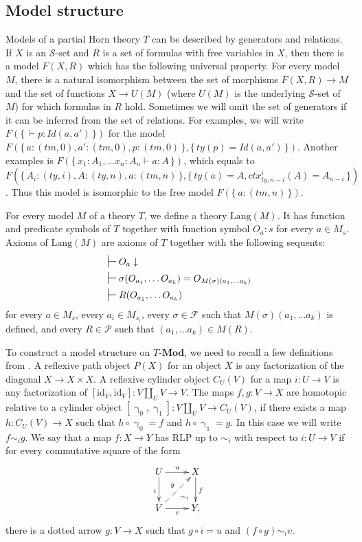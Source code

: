 \documentclass{mscs}
\newcommand{\id}{\mathrm{id}}
\newcommand{\Lang}{\mathrm{Lang}}
\newcommand{\Id}{\mathit{Id}}
\newcommand{\cat}[1]{\mathbf{#1}}
\newcommand{\Mod}[1]{#1\text{-}\cat{Mod}}
\newcommand{\cyli}{\upgamma}
\numberwithin{figure}{section}
\begin{document}
\subsection{Model structure}

Models of a partial Horn theory $T$ can be described by generators and relations.
If $X$ is an $\mathcal{S}$-set and $R$ is a set of formulas with free variables in $X$,
then there is a model $F(X,R)$ which has the following universal property.
For every model $M$, there is a natural isomorphism between the set of morphisms $F(X,R) \to M$
and the set of functions $X \to U(M)$ (where $U(M)$ is the underlying $\mathcal{S}$-set of $M$) for which formulas in $R$ hold.
Sometimes we will omit the set of generators if it can be inferred from the set of relations.
For examples, we will write $F(\{\,\vdash p : \Id(a,a')\,\})$ for the model $F(\{\,a : (tm,0), a' : (tm,0), p : (tm,0)\,\}, \{\,ty(p) = \Id(a,a')\,\})$.
Another examples is $F(\{\,x_1 : A_1, \ldots x_n : A_n \vdash a : A\,\})$,
which equals to $F(\{\,A_i : (ty,i), A : (ty,n), a : (tm,n)\,\}, \{\,ty(a) = A, ctx^i_{ty,n-i}(A) = A_{n-i}\,\})$.
Thus this model is isomorphic to the free model $F(\{\,a : (tm,n)\,\})$.

For every model $M$ of a theory $T$, we define a theory $\Lang(M)$.
It has function and predicate symbols of $T$ together with function symbol $O_a : s$ for every $a \in M_s$.
Axioms of $\Lang(M)$ are axioms of $T$ together with the following sequents:
\begin{align*}
& \sststile{}{} O_a \downarrow \\
& \sststile{}{} \sigma(O_{a_1}, \ldots O_{a_k}) = O_{M(\sigma)(a_1, \ldots a_k)} \\
& \sststile{}{} R(O_{a_1}, \ldots O_{a_k})
\end{align*}
for every $a \in M_s$, every $a_i \in M_{s_i}$,
every $\sigma \in \mathcal{F}$ such that $M(\sigma)(a_1, \ldots a_k)$ is defined,
and every $R \in \mathcal{P}$ such that $(a_1, \ldots a_k) \in M(R)$.

To construct a model structure on $\Mod{T}$, we need to recall a few definitions from \cite{f-model-structures}.
A reflexive path object $P(X)$ for an object $X$ is any factorization of the diagonal $X \to X \times X$.
A reflexive cylinder object $C_U(V)$ for a map $i : U \to V$ is any factorization of $[\id_V,\id_V] : V \amalg_U V \to V$.
The maps $f,g : V \to X$ are homotopic relative to a cylinder object $[\cyli_0,\cyli_1] : V \amalg_U V \to C_U(V)$, if there exists a map $h : C_U(V) \to X$
such that $h \circ \cyli_0 = f$ and $h \circ \cyli_1 = g$.
In this case we will write $f \sim_i g$.
We say that a map $f : X \to Y$ has RLP up to $\sim_i$ with respect to $i : U \to V$ if for every commutative square of the form
\[ \xymatrix{ U \ar[r]^u \ar@{}[dr]|(.7){\sim_i} \ar[d]_i & X \ar[d]^f \\
              V \ar[r]_v \ar@{-->}[ur]^g                  & Y,
            } \]
there is a dotted arrow $g : V \to X$ such that $g \circ i = u$ and $(f \circ g) \sim_i v$.
\end{document}
